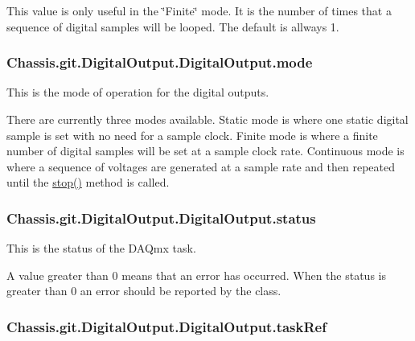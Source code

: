 This value is only useful in the \char`\"{}\-Finite\char`\"{} mode. It is the number of times that a sequence of digital samples will be looped. The default is allways 1. \hypertarget{class_chassis_8git_1_1_digital_output_1_1_digital_output_a0fe7aca56fb6dd3a7b1b070840b49c56}{
\subsubsection[{mode}]{\setlength{\rightskip}{0pt plus 5cm}Chassis.\-git.\-Digital\-Output.\-Digital\-Output.\-mode}}\label{class_chassis_8git_1_1_digital_output_1_1_digital_output_a0fe7aca56fb6dd3a7b1b070840b49c56}


This is the mode of operation for the digital outputs. 

There are currently three modes available. Static mode is where one static digital sample is set with no need for a sample clock. Finite mode is where a finite number of digital samples will be set at a sample clock rate. Continuous mode is where a sequence of voltages are generated at a sample rate and then repeated until the \hyperlink{class_chassis_8git_1_1_digital_output_1_1_digital_output_a25ea5c7440311f73c1ae463da9c57211}{stop()} method is called. \hypertarget{class_chassis_8git_1_1_digital_output_1_1_digital_output_ac80a92816c0356806a9f38349efd5d9a}{
\subsubsection[{status}]{\setlength{\rightskip}{0pt plus 5cm}Chassis.\-git.\-Digital\-Output.\-Digital\-Output.\-status}}\label{class_chassis_8git_1_1_digital_output_1_1_digital_output_ac80a92816c0356806a9f38349efd5d9a}


This is the status of the D\-A\-Qmx task. 

A value greater than 0 means that an error has occurred. When the status is greater than 0 an error should be reported by the class. \hypertarget{class_chassis_8git_1_1_digital_output_1_1_digital_output_a5cf84621110f881f2142f4af58c28926}{
\subsubsection[{task\-Ref}]{\setlength{\rightskip}{0pt plus 5cm}Chassis.\-git.\-Digital\-Output.\-Digital\-Output.\-task\-Ref}}\label{class_chassis_8git_1_1_digital_output_1_1_digital_output_a5cf84621110f881f2142f4af58c28926}


